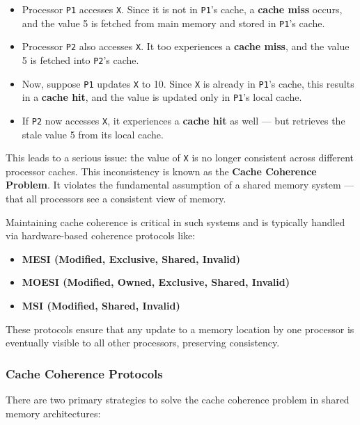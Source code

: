 \documentclass[12pt]{book}
\begin{document}
\begin{itemize}
    \item Processor \texttt{P1} accesses \texttt{X}. Since it is not in \texttt{P1}'s cache, a \textbf{cache miss} occurs, and the value 5 is fetched from main memory and stored in \texttt{P1}'s cache.
    \item Processor \texttt{P2} also accesses \texttt{X}. It too experiences a \textbf{cache miss}, and the value 5 is fetched into \texttt{P2}'s cache.
    \item Now, suppose \texttt{P1} updates \texttt{X} to 10. Since \texttt{X} is already in \texttt{P1}'s cache, this results in a \textbf{cache hit}, and the value is updated only in \texttt{P1}'s local cache.
    \item If \texttt{P2} now accesses \texttt{X}, it experiences a \textbf{cache hit} as well — but retrieves the stale value 5 from its local cache.
\end{itemize}

This leads to a serious issue: the value of \texttt{X} is no longer consistent across different processor caches. This inconsistency is known as the \textbf{Cache Coherence Problem}. It violates the fundamental assumption of a shared memory system — that all processors see a consistent view of memory.

Maintaining cache coherence is critical in such systems and is typically handled via hardware-based coherence protocols like:
\begin{itemize}
    \item \textbf{MESI (Modified, Exclusive, Shared, Invalid)}
    \item \textbf{MOESI (Modified, Owned, Exclusive, Shared, Invalid)}
    \item \textbf{MSI (Modified, Shared, Invalid)}
\end{itemize}

These protocols ensure that any update to a memory location by one processor is eventually visible to all other processors, preserving consistency.

\subsubsection*{Cache Coherence Protocols}

There are two primary strategies to solve the cache coherence problem in shared memory architectures:
\end{document}
